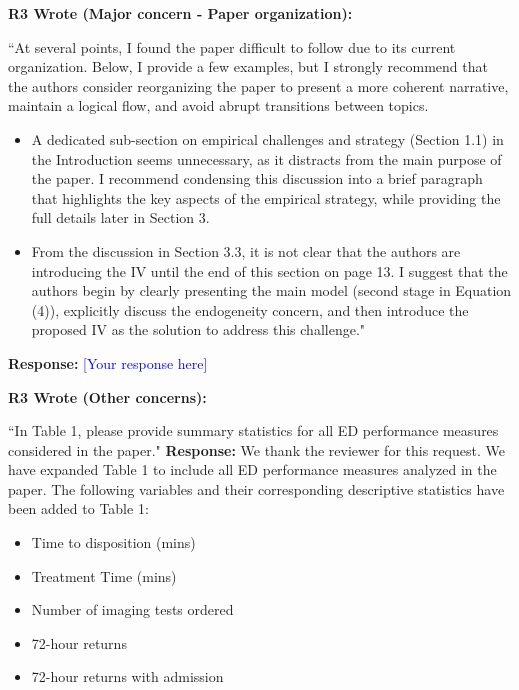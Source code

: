 \documentclass[11pt]{article}
\newenvironment{quote2}
{ \bigskip
\noindent
         \small\em
         \baselineskip=14pt
}
\newcommand{\1}{\hbox{\rm 1\kern-.35em 1}}
\begin{document}
\begin{quote2}
\textbf{R3 Wrote (Major concern -  Paper organization):}  

\noindent``At several points, I found the paper difficult to follow due to its current organization. Below, I provide a few examples, but I strongly recommend that the authors consider reorganizing the paper to present a more coherent narrative, maintain a logical flow, and avoid abrupt transitions between topics.

\begin{itemize}
    \item A dedicated sub-section on empirical challenges and strategy (Section 1.1) in the Introduction seems unnecessary, as it distracts from the main purpose of the paper. I recommend condensing this discussion into a brief paragraph that highlights the key aspects of the empirical strategy, while providing the full details later in Section 3.
    \item From the discussion in Section 3.3, it is not clear that the authors are introducing the IV until the end of this section on page 13. I suggest that the authors begin by clearly presenting the main model (second stage in Equation (4)), explicitly discuss the endogeneity concern, and then introduce the proposed IV as the solution to address this challenge."
\end{itemize}

\end{quote2}

\noindent\textbf{Response:} \textcolor{blue}{[Your response here]}



\begin{quote2}
\textbf{R3 Wrote (Other concerns):}  

 ``In Table 1, please provide summary statistics for all ED performance measures considered in the paper."
\end{quote2}


\noindent\textbf{Response:} \color{blue}We thank the reviewer for this request. We have expanded Table 1 to include all ED performance measures analyzed in the paper. The following variables and their corresponding descriptive statistics have been added to Table 1:

\begin{itemize}
\item Time to disposition (mins)
\item Treatment Time (mins)
\item Number of imaging tests ordered
\item 72-hour returns
\item 72-hour returns with admission
\end{itemize}
\end{document}
